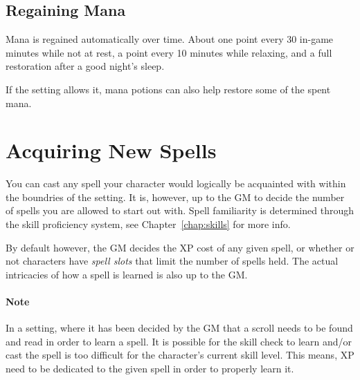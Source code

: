 \subsection{Regaining Mana}
Mana is regained automatically over time.
About one point every 30 in-game minutes while not at rest,
a point every 10 minutes while relaxing,
and a full restoration after a good night's sleep.

If the setting allows it, mana potions can also help restore some of the spent mana.

\section{Acquiring New Spells}
You can cast any spell your character would logically be acquainted with within the boundries of the setting.
It is, however, up to the GM to decide the number of spells you are allowed to start out with.
Spell familiarity is determined through the skill proficiency system, see Chapter~\ref{chap:skills} for more info.

By default however, the GM decides the XP cost of any given spell, or whether or not characters have \textit{spell slots} that limit the number of spells held. 
The actual intricacies of how a spell is learned is also up to the GM.

\paragraph{Note} In a setting, where it has been decided by the GM that a scroll needs to be found and read in order to learn a spell.
It is possible for the skill check to learn and/or cast the spell is too difficult for the character's current skill level.
This means, XP need to be dedicated to the given spell in order to properly learn it.